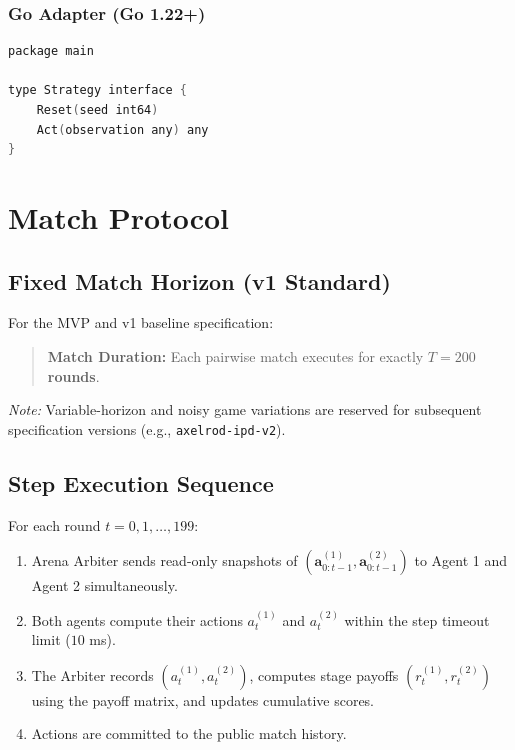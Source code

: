 \documentclass[11pt,a4paper]{article}
\begin{document}
\subsubsection{Go Adapter (Go 1.22+)}
\begin{lstlisting}[language=C]
package main

type Strategy interface {
    Reset(seed int64)
    Act(observation any) any
}
\end{lstlisting}


\section{Match Protocol}

\subsection{Fixed Match Horizon (v1 Standard)}
For the MVP and v1 baseline specification:
\begin{quote}
\textbf{Match Duration:} Each pairwise match executes for exactly \textbf{$T = 200$ rounds}.
\end{quote}
\textit{Note:} Variable-horizon and noisy game variations are reserved for subsequent specification versions (e.g., \texttt{axelrod-ipd-v2}).

\subsection{Step Execution Sequence}
For each round $t = 0, 1, \dots, 199$:
\begin{enumerate}
    \item Arena Arbiter sends read-only snapshots of $(\mathbf{a}_{0:t-1}^{(1)}, \mathbf{a}_{0:t-1}^{(2)})$ to Agent 1 and Agent 2 simultaneously.
    \item Both agents compute their actions $a_t^{(1)}$ and $a_t^{(2)}$ within the step timeout limit ($10$ ms).
    \item The Arbiter records $(a_t^{(1)}, a_t^{(2)})$, computes stage payoffs $(r_t^{(1)}, r_t^{(2)})$ using the payoff matrix, and updates cumulative scores.
    \item Actions are committed to the public match history.
\end{enumerate}
\end{document}
